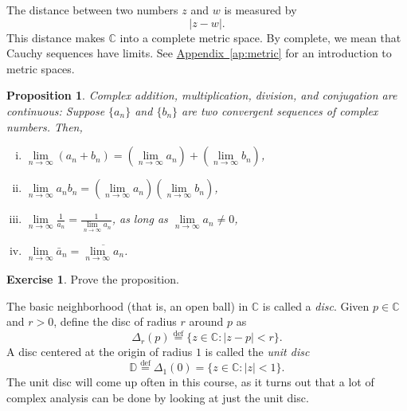 \documentclass[12pt,openany]{book}
\newcommand{\sabs}[1]{\lvert {#1} \rvert}
\newcommand{\C}{{\mathbb{C}}}
\newcommand{\D}{{\mathbb{D}}}
\newcommand{\myindex}[1]{#1\index{#1}}
\theoremstyle{plain}
\newtheorem{prop}[thm]{Proposition}
\theoremstyle{remark}
\theoremstyle{definition}
\newenvironment{exbox}{%
    \def\FrameCommand{\vrule width 1pt \relax\hspace{10pt}}%
    \MakeFramed{\advance\hsize-\width\FrameRestore}%
}{%
    \endMakeFramed
}
\theoremstyle{exercise}
\newtheorem{exercise}{Exercise}[section]
\theoremstyle{example}
\newcommand{\Appendixref}[1]{\hyperref[#1]{Appendix~\ref*{#1}}}
\begin{document}
The distance between two numbers $z$ and $w$ is measured by
\begin{equation*}
\sabs{z-w} .
\end{equation*}
This distance makes $\C$ into a complete metric space.  By complete, we mean that
Cauchy sequences have limits.  See \Appendixref{ap:metric}
for an introduction to metric spaces.

\begin{prop}
Complex addition, multiplication, division, and conjugation are continuous:
Suppose $\{ a_n \}$ and $\{ b_n \}$ are two convergent sequences
of complex numbers.  Then,
\begin{enumerate}[(i)]
\item
$\lim\limits_{n\to\infty} (a_n + b_n) = 
\left(\lim\limits_{n\to\infty} a_n \right) +
\left(\lim\limits_{n\to\infty} b_n \right)$,
\item
$\lim\limits_{n\to\infty} a_n b_n = 
\left(\lim\limits_{n\to\infty} a_n \right)
\left(\lim\limits_{n\to\infty} b_n \right)$,
\item
$\lim\limits_{n\to\infty} \frac{1}{a_n} = \frac{1}{\lim\limits_{n\to\infty} a_n}$,
as long as $\lim\limits_{n\to\infty} a_n \not= 0$,
\item
$\lim\limits_{n\to\infty} \bar{a}_n = 
\overline{\lim\limits_{n\to\infty} a_n}$.
\end{enumerate}
\end{prop}

\begin{exbox}
\begin{exercise}%
Prove the proposition.
\end{exercise}
\end{exbox}

The basic neighborhood (that is, an
open ball) in $\C$
is called a \emph{\myindex{disc}}.
Given $p \in \C$ and $r > 0$, define the disc of radius $r$ around
$p$
as
%
\begin{equation*}
\Delta_r(p)
\overset{\text{def}}{=}
\bigl\{ z \in \C : \sabs{z-p} < r \bigr\} .
\end{equation*}
A disc centered at the origin of radius $1$ is called the
\emph{\myindex{unit disc}}
%
\begin{equation*}
\D
\overset{\text{def}}{=}
\Delta_1(0)
=
\bigl\{ z \in \C : \sabs{z} < 1 \bigr\} .
\end{equation*}
The unit disc will come up often in this course, as it turns out that
a lot of complex analysis can be done by looking at just the unit disc.
\end{document}
